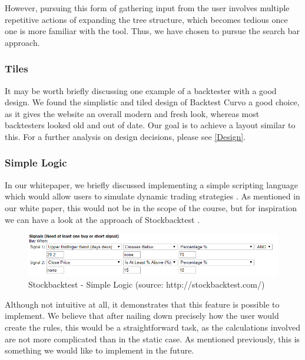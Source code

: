 \documentclass[main.tex]{subfiles}
\begin{document}
However, pursuing this form of gathering input from the user involves multiple repetitive actions of expanding the tree structure, which becomes tedious once one is more familiar with the tool. Thus, we have chosen to pursue the search bar approach.


\subsubsection*{Tiles}

It may be worth briefly discussing one example of a backtester with a good design. We found the simplistic and tiled design of Backtest Curvo \cite{backtestcurvo} a good choice, as it gives the website an overall modern and fresh look, whereas most backtesters looked old and out of date. Our goal is to achieve a layout similar to this. For a further analysis on design decisions, please see \ref{Design}.

\subsubsection*{Simple Logic}

In our whitepaper, we briefly discussed implementing a simple scripting language which would allow users to simulate dynamic trading strategies \cite{WP}. As mentioned in our white paper, this would not be in the scope of the course, but for inspiration we can have a look at the approach of Stockbacktest \cite{stockbacktest}.

\begin{figure}[H]
   \centering
   \includegraphics[scale=0.7]{02Background/02Pictures/stockbacktest.png}
   \caption{Stockbacktest - Simple Logic (source: http://stockbacktest.com/)}
\end{figure}

Although not intuitive at all, it demonstrates that this feature is possible to implement. We believe that after nailing down precisely how the user would create the rules, this would be a straightforward task, as the calculations involved are not more complicated than in the static case. As mentioned previously, this is something we would like to implement in the future.
\end{document}
